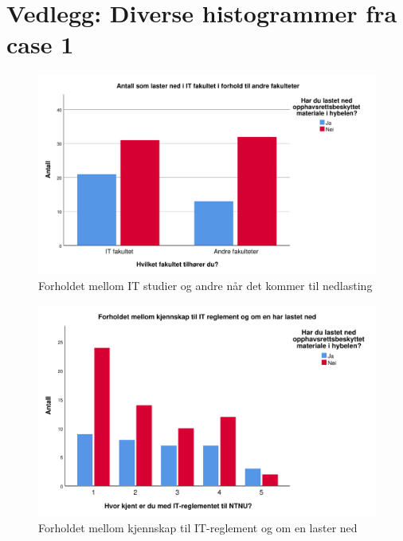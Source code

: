 \chapter{Vedlegg: Diverse histogrammer fra case 1}
\label{vedlegg:histogrammer}

\begin{figure}[H]
    \centering
    \includegraphics[scale=0.45]{case_1/bilder/IT_lasterned.pdf}
    \caption[Forskjellen mellom fakultetene og om de laster ned]{Forholdet mellom IT studier og andre når det kommer til nedlasting}
    \label{fig:IT-lasterned}
\end{figure}

\begin{figure}[H]
    \centering
    \includegraphics[scale=0.45]{case_1/bilder/reglement_lasterned.pdf}
    \caption[Forholdet mellom kjennskap til IT-reglement og om de laster ned]{Forholdet mellom kjennskap til IT-reglement og om en laster ned}
    \label{fig:reglement-lasterned}
\end{figure}


